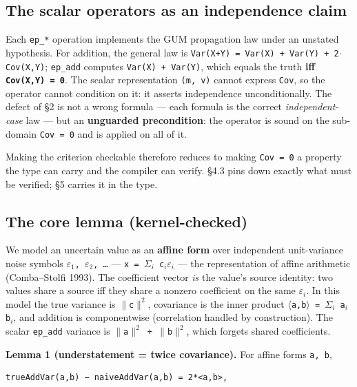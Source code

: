 \documentclass[sigplan,review,anonymous,10pt]{acmart}
\begin{document}
\subsection{The scalar operators as an independence claim}

Each \texttt{ep\_*} operation implements the GUM propagation law under an unstated hypothesis. For addition, the general law is \texttt{Var(X+Y) = Var(X) + Var(Y) + 2$\cdot$Cov(X,Y)}; \texttt{ep\_add} computes \texttt{Var(X) + Var(Y)}, which equals the truth \textbf{iff \texttt{Cov(X,Y) = 0}}. The scalar representation \texttt{(m, v)} cannot express \texttt{Cov}, so the operator cannot condition on it: it asserts independence unconditionally. The defect of §2 is not a wrong formula --- each formula is the correct \emph{independent-case} law --- but an \textbf{unguarded precondition}: the operator is sound on the sub-domain \texttt{Cov = 0} and is applied on all of it.

Making the criterion checkable therefore reduces to making \texttt{Cov = 0} a property the type can carry and the compiler can verify. §4.3 pins down exactly what must be verified; §5 carries it in the type.

\subsection{The core lemma (kernel-checked)}

We model an uncertain value as an \textbf{affine form} over independent unit-variance noise symbols \texttt{$\varepsilon_{1}$, $\varepsilon_{2}$, \ldots{}} --- \texttt{x = $\Sigma_{i}$ c$_{i}\varepsilon_{i}$} --- the representation of affine arithmetic (Comba--Stolfi 1993). The coefficient vector \emph{is} the value's source identity: two values share a source iff they share a nonzero coefficient on the same \texttt{$\varepsilon_{i}$}. In this model the true variance is \texttt{$\|$c$\|^{2}$}, covariance is the inner product \texttt{$\langle$a,b$\rangle$ = $\Sigma_{i}$ a$_{i}$b$_{i}$}, and addition is componentwise (correlation handled by construction). The scalar \texttt{ep\_add} variance is \texttt{$\|$a$\|^{2}$ + $\|$b$\|^{2}$}, which forgets shared coefficients.

\textbf{Lemma 1 (understatement = twice covariance).} For affine forms \texttt{a, b},

\begin{lstlisting}
trueAddVar(a,b) − naiveAddVar(a,b) = 2*<a,b>,
\end{lstlisting}
\end{document}
